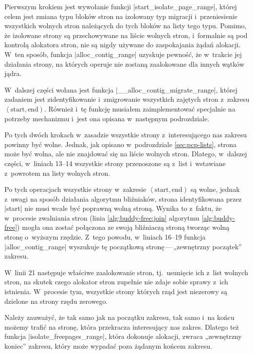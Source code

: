 Pierwszym krokiem jest wywołanie funkcji
\code|start_isolate_page_range|, której celem jest zmiana typu bloków
stron na izolowany typ migracji i~przeniesienie wszystkich wolnych
stron należących do tych bloków na listy tego typu.  Pomimo, że
izolowane strony są przechowywane na liście wolnych stron, i~formalnie
są pod kontrolą alokatora stron, nie są nigdy używane do zaspokajania
żądań alokacji.  W~ten sposób, funkcja \code|alloc_contig_range|
uzyskuje pewność, że w~trakcie jej działania strony, na których
operuje nie zostaną zaalokowane dla innych wątków jądra.

W~dalszej części wołana jest funkcja
\code|__alloc_contig_migrate_range|, której zadaniem jest
zidentyfikowanie i~zmigrowanie wszystkich zajętych stron z~zakresu
$\left<\mathrm{start}, \mathrm{end}\right)$.  Również i~tę funkcję
musiałem zaimplementować specjalnie na potrzeby mechanizmu  i~jest
ona opisana w~następnym podrozdziale.

Po tych dwóch krokach w~zasadzie wszystkie strony z~interesującego nas
zakresu powinny być wolne.  Jednak, jak opisano w~podrozdziale
\ref{sec:pcp-lists}, strona może być wolna, ale nie znajdować się na
liście wolnych stron.  Dlatego, w~dalszej części, w~liniach 13--14
wszystkie strony przenoszone są z~list  i~wstawiane z~powrotem na
listy wolnych stron.

Po tych operacjach wszystkie strony w~zakresie $\left<\mathrm{start},
\mathrm{end}\right)$ są wolne, jednak z~uwagi na sposób działania
algorytmu bliźniaków, strona identyfikowana przez \code|start| nie
musi wcale być poprawną wolną stroną.  Wynika to z~faktu, że
w~procesie zwalniania stron (linia \ref{alg:buddy-free:join} algorytmu
\ref{alg:buddy-free}) mogła ona zostać połączona ze swoją bliźniaczą
stroną tworząc wolną stronę o~wyższym rzędzie.  Z~tego powodu,
w~liniach 16--19 funkcja \code|alloc_contig_range| wyszukuje tę
początkową stronę\,---\,„zewnętrzny początek” zakresu.

W~linii 21 następuje właściwe zaalokowanie stron, tj.\ usunięcie ich
z~list wolnych stron, na skutek czego alokator stron zupełnie nie
zdaje sobie sprawy z~ich istnienia.  W~procesie tym, wszystkie strony
których rząd jest niezerowy są dzielone na strony rzędu zerowego.

Należy zauważyć, że tak samo jak na początku zakresu, tak samo i~na
końcu możemy trafić na stronę, która przekracza interesujący nas
zakres.  Dlatego też funkcja \code|isolate_freepages_range|, która
dokonuje alokacji, zwraca „zewnętrzny koniec” zakresu, który może
wypadać poza żądanym końcem zakresu.

